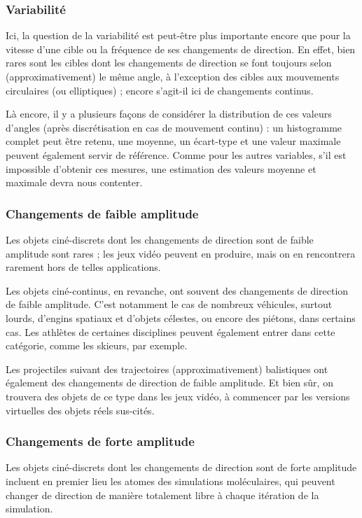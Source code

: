 	
	\FloatBarrier \subsubsection{Variabilité}
	Ici, la question de la variabilité est peut-être plus importante encore que pour la vitesse d'une cible ou la fréquence de ses changements de direction. En effet, bien rares sont les cibles dont les changements de direction se font toujours selon (approximativement) le même angle, à l'exception des cibles aux mouvements circulaires (ou elliptiques) ; encore s'agit-il ici de changements continus.
	
	Là encore, il y a plusieurs façons de considérer la distribution de ces valeurs d'angles (après discrétisation en cas de mouvement continu) : un histogramme complet peut être retenu, une moyenne, un écart-type et une valeur maximale peuvent également servir de référence. Comme pour les autres variables, s'il est impossible d'obtenir ces mesures, une estimation des valeurs moyenne et maximale devra nous contenter.
	
	\FloatBarrier \subsubsection{Changements de faible amplitude}
	Les objets ciné-discrets dont les changements de direction sont de faible amplitude sont rares ; les jeux vidéo peuvent en produire, mais on en rencontrera rarement hors de telles applications.
	
	Les objets ciné-continus, en revanche, ont souvent des changements de direction de faible amplitude. C'est notamment le cas de nombreux véhicules, surtout lourds, d'engins spatiaux et d'objets célestes, ou encore des piétons, dans certains cas. Les athlètes de certaines disciplines peuvent également entrer dans cette catégorie, comme les skieurs, par exemple.
	
	Les projectiles suivant des trajectoires (approximativement) balistiques ont également des changements de direction de faible amplitude. Et bien sûr, on trouvera des objets de ce type dans les jeux vidéo, à commencer par les versions virtuelles des objets réels sus-cités.
	
	\FloatBarrier \subsubsection{Changements de forte amplitude}
	Les objets ciné-discrets dont les changements de direction sont de forte amplitude incluent en premier lieu les atomes des simulations moléculaires, qui peuvent changer de direction de manière totalement libre à chaque itération de la simulation.
	
